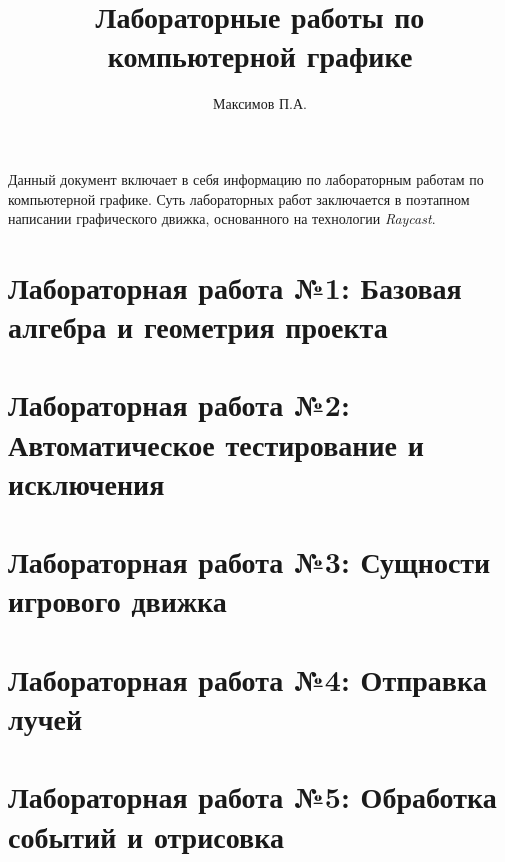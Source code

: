 \documentclass[14pt, a4paper, titlepage]{extarticle}
\title{Лабораторные работы по компьютерной графике}
\author{Максимов П.А.}
\begin{document}
	\maketitle

	\tableofcontents

	\pagebreak

	Данный документ включает в себя информацию по лабораторным работам по компьютерной графике. Суть лабораторных работ заключается в поэтапном написании графического движка, основанного на технологии \textit{Raycast}. 

	\section{Лабораторная работа №1: Базовая алгебра и геометрия проекта}
	
		
	\pagebreak
	\section{Лабораторная работа №2: Автоматическое тестирование и исключения}
	

	\pagebreak
	\section{Лабораторная работа №3: Сущности игрового движка}
	

	\pagebreak
	\section{Лабораторная работа №4: Отправка лучей}
	

	\pagebreak
	\section{Лабораторная работа №5: Обработка событий и отрисовка}
	
\end{document}
